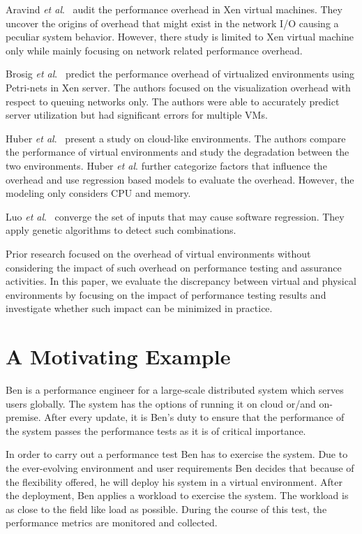 \documentclass[smallextended]{svjour3}       %
\begin{document}
Aravind \textit{et al$.$}~\cite{menon2005diagnosing} audit the performance overhead in Xen virtual machines. They uncover the origins of overhead that might exist in the network I/O causing a peculiar system behavior. However, there study is limited to Xen virtual machine only while mainly focusing on network related performance overhead.

Brosig \textit{et al$.$}~\cite{brosig2013evaluating} predict the performance overhead of virtualized environments using Petri-nets in Xen server. The authors focused on the visualization overhead with respect to queuing networks only. The authors were able to accurately predict server utilization but had significant errors for multiple VMs.


Huber \textit{et al$.$}~\cite{huber2011evaluating} present a study on cloud-like environments. The authors compare the performance of virtual environments and study the degradation between the two environments. Huber \textit{et al$.$} further categorize factors that influence the overhead and use regression based models to evaluate the overhead. However, the modeling only considers CPU and memory.


Luo \textit{et al$.$}~\cite{Luo:2016:MPR:2901739.2901765} converge the set of inputs that may cause software regression. They apply genetic algorithms to detect such combinations. 

Prior research focused on the overhead of virtual environments without considering the impact of such overhead on performance testing and assurance activities. In this paper, we evaluate the discrepancy between virtual and physical environments by focusing on the impact of performance testing results and investigate whether such impact can be minimized in practice.

\section{A Motivating Example}
\label{sec:motivating_example}

Ben is a performance engineer for a large-scale distributed system which serves users globally. The system has the options of running it on cloud or/and on-premise. After every update, it is Ben's duty to ensure that the performance of the system passes the performance tests as it is of critical importance.

In order to carry out a performance test Ben has to exercise the system. Due to the ever-evolving environment and user requirements Ben decides that because of the flexibility offered, he will deploy his system in a virtual environment. After the deployment, Ben applies a workload to exercise the system. The workload is as close to the field like load as possible. During the course of this test, the performance metrics are monitored and collected.
\end{document}
